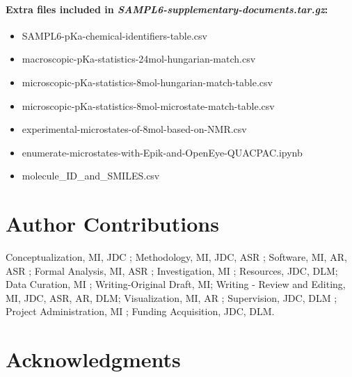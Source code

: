 \documentclass[9pt,lineno,final]{elife}
\begin{document}
\paragraph{Extra files included in \textit{SAMPL6-supplementary-documents.tar.gz}:}  
\begin{itemize}
\item SAMPL6-pKa-chemical-identifiers-table.csv 
\item macroscopic-pKa-statistics-24mol-hungarian-match.csv
\item microscopic-pKa-statistics-8mol-hungarian-match-table.csv
\item microscopic-pKa-statistics-8mol-microstate-match-table.csv
\item experimental-microstates-of-8mol-based-on-NMR.csv
\item enumerate-microstates-with-Epik-and-OpenEye-QUACPAC.ipynb
\item molecule\_ID\_and\_SMILES.csv
\end{itemize}


\section{Author Contributions}

Conceptualization, MI, JDC ; Methodology, MI, JDC, ASR ; Software, MI, AR, ASR ; Formal Analysis, MI, ASR ; Investigation, MI ; Resources, JDC, DLM;  Data Curation, MI ; Writing-Original Draft, MI; Writing - Review and Editing, MI, JDC, ASR, AR, DLM; Visualization, MI, AR ; Supervision, JDC, DLM ; Project Administration, MI ; Funding Acquisition, JDC, DLM.


\section{Acknowledgments}
\end{document}

